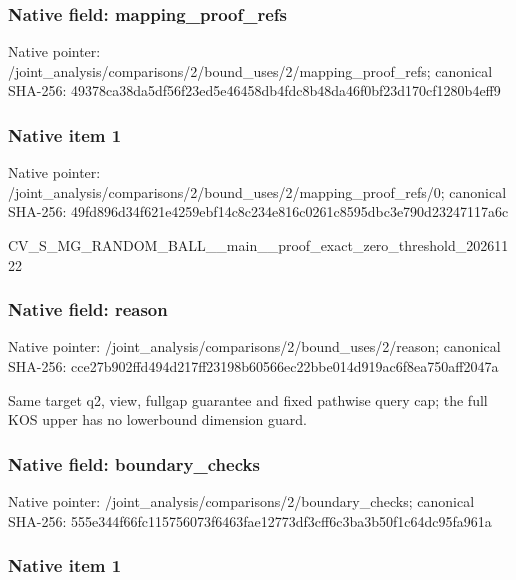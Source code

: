 \documentclass[10pt,a4paper]{article}
\begin{document}
\subsubsection{Native field: mapping\_proof\_refs}


Native pointer: /joint\_analysis/comparis\allowbreak{}ons/2/bound\_uses/2/mappi\allowbreak{}ng\_proof\_refs; canonical SHA-256: 49378ca38da5df56f23ed5e4\allowbreak{}6458db4fdc8b48da46f0bf23\allowbreak{}d170cf1280b4eff9



\subsubsection{Native item 1}


Native pointer: /joint\_analysis/comparis\allowbreak{}ons/2/bound\_uses/2/mappi\allowbreak{}ng\_proof\_refs/0; canonical SHA-256: 49fd896d34f621e4259ebf14\allowbreak{}c8c234e816c0261c8595dbc3\allowbreak{}e790d23247117a6c


CV\_S\_MG\_RANDOM\_BALL\_\_mai\allowbreak{}n\_\_proof\_exact\_zero\_thre\allowbreak{}shold\_20261122


\subsubsection{Native field: reason}


Native pointer: /joint\_analysis/comparis\allowbreak{}ons/2/bound\_uses/2/reaso\allowbreak{}n; canonical SHA-256: cce27b902ffd494d217ff231\allowbreak{}98b60566ec22bbe014d919ac\allowbreak{}6f8ea750aff2047a


Same target q2, view, fullgap guarantee and fixed pathwise query cap; the full KOS upper has no lowerbound dimension guard.


\subsubsection{Native field: boundary\_checks}


Native pointer: /joint\_analysis/comparis\allowbreak{}ons/2/boundary\_checks; canonical SHA-256: 555e344f66fc115756073f64\allowbreak{}63fae12773df3cff6c3ba3b5\allowbreak{}0f1c64dc95fa961a



\subsubsection{Native item 1}
\end{document}
